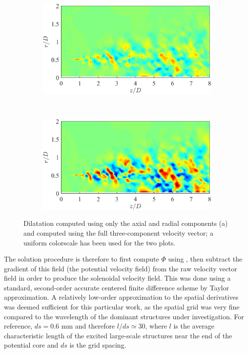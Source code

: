 \begin{figure}
	\centering
	\begin{subfigure}{0.75\textwidth}
		\centering
		\includegraphics[width=0.95\linewidth]{Figures/LES_2CDil.png}
		\caption{}
	\end{subfigure}\\
	\begin{subfigure}{0.75\textwidth}
		\centering
		\includegraphics[width=0.95\linewidth]{Figures/LES_3CDil.png}
		\caption{}
	\end{subfigure}
	\caption{Dilatation computed using only the axial and radial components (a) and computed using the full three-component velocity vector; a uniform colorscale has been used for the two plots.}
	\label{fig:LES_streamwise_dil}
\end{figure}

The solution procedure is therefore to first compute $\Phi$ using , then subtract the gradient of this field (the potential velocity field) from the raw velocity vector field in order to produce the solenoidal velocity field. 
This was done using a standard, second-order accurate centered finite difference scheme by Taylor approximation.
A relatively low-order approximation to the spatial derivatives was deemed sufficient for this particular work, as the spatial grid was very fine compared to the wavelength of the dominant structures under investigation.
For reference, $ds = 0.6$ mm and therefore $l/ds \simeq 30$, where $l$ is the average characteristic length of the excited large-scale structures near the end of the potential core and $ds$ is the grid spacing.

